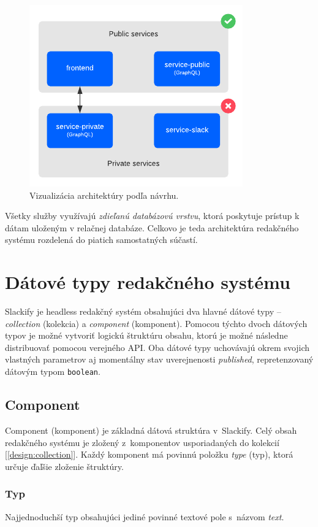 \begin{figure}[h]
	\centering
	\includegraphics[scale=1.2]{obrazky-figures/architecture}
	\caption{Vizualizácia architektúry podľa návrhu.}
\end{figure}

\noindent Všetky služby využívajú \emph{zdieľanú databázovú vrstvu}, ktorá poskytuje prístup k dátam uloženým v relačnej databáze. Celkovo je teda architektúra redakčného systému rozdelená do piatich samostatných súčastí.

\section{Dátové typy redakčného systému}
\label{theory:data_types}
Slackify je headless redakčný systém obsahujúci dva hlavné dátové typy -- \emph{collection} (kolekcia) a \emph{component} (komponent). Pomocou týchto dvoch dátových typov je možné vytvoriť logickú štruktúru obsahu, ktorú je možné následne distribuovať pomocou verejného API. Oba dátové typy uchovávajú okrem svojich vlastných parametrov aj momentálny stav uverejnenosti \emph{published}, repretenzovaný dátovým typom \texttt{boolean}.

\subsection{Component}
Component (komponent) je základná dátová struktúra v~Slackify. Celý obsah redakčného systému je zložený z~komponentov usporiadaných do kolekcií [\ref{design:collection}]. Každý komponent má povinnú položku \emph{type} (typ), ktorá určuje ďaľšie zloženie štruktúry.

\subsubsection{Typ }
Najjednoduchší typ obsahujúci jediné povinné textové pole s~názvom \emph{text}.

